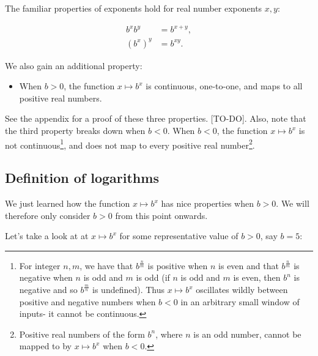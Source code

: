 The familiar properties of exponents hold for real number exponents $x, y$:

\begin{align*}
    b^x b^y &= b^{x + y}, \\
    (b^x)^y &= b^{xy}.
\end{align*}

We also gain an additional property:

\begin{itemize}
    \item When $b > 0$, the function $x \mapsto b^x$ is continuous, one-to-one, and maps to all positive real numbers.
\end{itemize}

See the appendix for a proof of these three properties. [TO-DO]. Also, note that the third property breaks down when $b < 0$. When $b < 0$, the function $x \mapsto b^x$ is not continuous\footnote{For integer $n, m$, we have that $b^{\frac{n}{m}}$ is positive when $n$ is even and that $b^{\frac{n}{m}}$ is negative when $n$ is odd and $m$ is odd (if $n$ is odd and $m$ is even, then $b^n$ is negative and so $b^{\frac{m}{n}}$ is undefined). Thus $x \mapsto b^x$ oscillates wildly between positive and negative numbers when $b < 0$ in an arbitrary small window of inputs- it cannot be continuous.}, and does not map to every positive real number\footnote{Positive real numbers of the form $b^n$, where $n$ is an odd number, cannot be mapped to by $x \mapsto b^x$ when $b < 0$.}.

\subsection*{Definition of logarithms}

We just learned how the function $x \mapsto b^x$ has nice properties when $b > 0$. We will therefore only consider $b > 0$ from this point onwards.

Let's take a look at at $x \mapsto b^x$ for some representative value of $b > 0$, say $b = 5$:

\begin{center}
\end{center}

